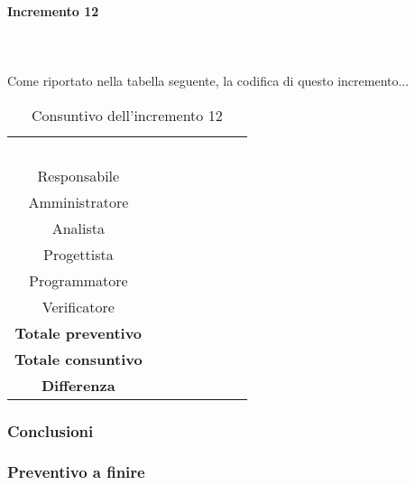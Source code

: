\paragraph*{Incremento 12} \mbox{} \\ \mbox{} \\
Come riportato nella tabella seguente, la codifica di questo incremento...
\begin{table}[H]
\centering\renewcommand{\arraystretch}{1.5}
\caption{Consuntivo dell'incremento 12}
\vspace{0.2cm}
\begin{tabular}{ c c c }
\rowcolor{redafk}
\textcolor{white}{\textbf{Ruolo}} & \textcolor{white}{\textbf{Ore}} &
\textcolor{white}{\textbf{Costo}}  \\
Responsabile 	&  &  \\
Amministratore 	&  	&  \\
Analista 		&   	&  \\
Progettista		&   	& \\
Programmatore	&  	& \\
Verificatore 	&  &  \\
\textbf{Totale preventivo} & &   \\
\textbf{Totale consuntivo} &  &   \\
\rowcolor{lastrowcolor}
\textbf{Differenza} & &  \\
\end{tabular}
\end{table}

\subsubsection{Conclusioni}

\subsubsection{Preventivo a finire}